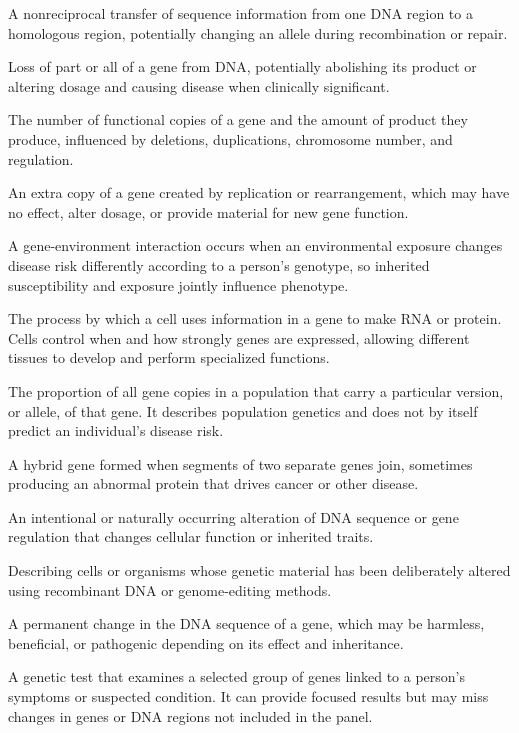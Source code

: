  A nonreciprocal transfer of sequence information from one DNA region to a homologous region, potentially changing an allele during recombination or repair.

 Loss of part or all of a gene from DNA, potentially abolishing its product or altering dosage and causing disease when clinically significant.

 The number of functional copies of a gene and the amount of product they produce, influenced by deletions, duplications, chromosome number, and regulation.

 An extra copy of a gene created by replication or rearrangement, which may have no effect, alter dosage, or provide material for new gene function.

 A gene-environment interaction occurs when an environmental exposure changes disease risk differently according to a person's genotype, so inherited susceptibility and exposure jointly influence phenotype.

 The process by which a cell uses information in a gene to make RNA or protein. Cells control when and how strongly genes are expressed, allowing different tissues to develop and perform specialized functions.

 The proportion of all gene copies in a population that carry a particular version, or allele, of that gene. It describes population genetics and does not by itself predict an individual’s disease risk.

 A hybrid gene formed when segments of two separate genes join, sometimes producing an abnormal protein that drives cancer or other disease.

 An intentional or naturally occurring alteration of DNA sequence or gene regulation that changes cellular function or inherited traits.

 Describing cells or organisms whose genetic material has been deliberately altered using recombinant DNA or genome-editing methods.

 A permanent change in the DNA sequence of a gene, which may be harmless, beneficial, or pathogenic depending on its effect and inheritance.

 A genetic test that examines a selected group of genes linked to a person’s symptoms or suspected condition. It can provide focused results but may miss changes in genes or DNA regions not included in the panel.

